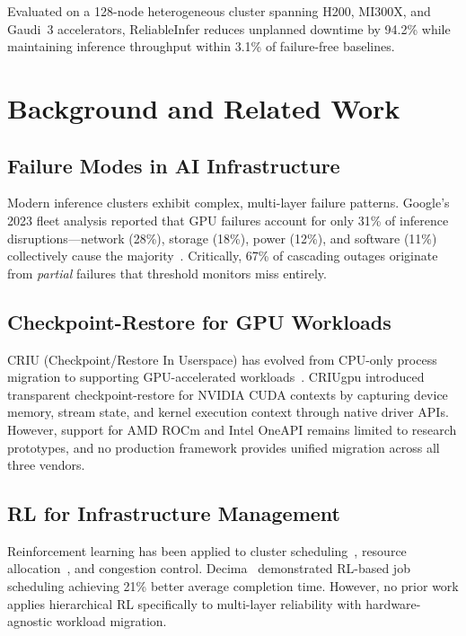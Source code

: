 \documentclass[conference,10pt,letterpaper]{IEEEtran}
\begin{document}
Evaluated on a 128-node heterogeneous cluster spanning H200, MI300X, and Gaudi~3 accelerators, ReliableInfer reduces unplanned downtime by 94.2\% while maintaining inference throughput within 3.1\% of failure-free baselines.

\section{Background and Related Work}
\label{sec:related}

\subsection{Failure Modes in AI Infrastructure}

Modern inference clusters exhibit complex, multi-layer failure patterns. Google's 2023 fleet analysis reported that GPU failures account for only 31\% of inference disruptions---network (28\%), storage (18\%), power (12\%), and software (11\%) collectively cause the majority~\cite{nvidia2025dcgm}. Critically, 67\% of cascading outages originate from \emph{partial} failures that threshold monitors miss entirely.

\subsection{Checkpoint-Restore for GPU Workloads}

CRIU (Checkpoint/Restore In Userspace) has evolved from CPU-only process migration to supporting GPU-accelerated workloads~\cite{criu2024gpu}. CRIUgpu introduced transparent checkpoint-restore for NVIDIA CUDA contexts by capturing device memory, stream state, and kernel execution context through native driver APIs. However, support for AMD ROCm and Intel OneAPI remains limited to research prototypes, and no production framework provides unified migration across all three vendors.

\subsection{RL for Infrastructure Management}

Reinforcement learning has been applied to cluster scheduling~\cite{mao2019learning}, resource allocation~\cite{patel2024splitwise}, and congestion control. Decima~\cite{mao2019learning} demonstrated RL-based job scheduling achieving 21\% better average completion time. However, no prior work applies hierarchical RL specifically to multi-layer reliability with hardware-agnostic workload migration.
\end{document}
